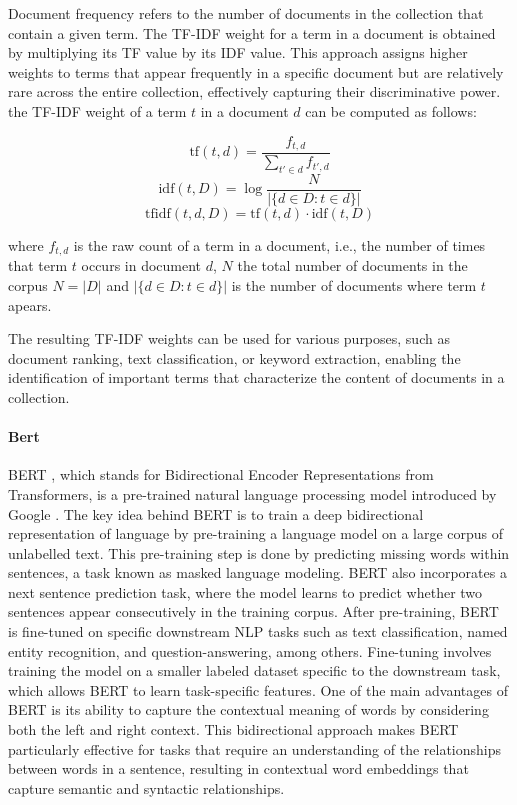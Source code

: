 \documentclass[a4paper,12pt]{article}
\begin{document}
Document frequency refers to the number of documents in the collection that contain a given term. The TF-IDF weight for a term in a document is obtained by multiplying its TF value by its IDF value. This approach assigns higher weights to terms that appear frequently in a specific document but are relatively rare across the entire collection, effectively capturing their discriminative power. the TF-IDF weight of a term $t$ in a document $d$ can be computed as follows:

$${\displaystyle \mathrm {tf} (t,d)={\frac {f_{t,d}}{\sum _{t'\in d}{f_{t',d}}}}}$$
$$ \mathrm{idf}(t, D) =  \log \frac{N}{|\{d \in D: t \in d\}|}$$
$${\displaystyle \mathrm {tfidf} (t,d,D)=\mathrm {tf} (t,d)\cdot \mathrm {idf} (t,D)}$$


where $f_{t,d}$ is the raw count of a term in a document, i.e., the number of times that term $t$ occurs in document $d$,
$N$ the total number of documents in the corpus $N=|D|$ and  $|\{d \in D: t \in d\}|$ is the number of documents where term $t$ apears.

The resulting TF-IDF weights can be used for various purposes, such as document ranking, text classification, or keyword extraction, enabling the identification of important terms that characterize the content of documents in a collection.

\paragraph{Bert}

BERT \cite{bert}, which stands for Bidirectional Encoder Representations from Transformers, is a pre-trained natural language processing model introduced by Google \cite{bert}.
The key idea behind BERT is to train a deep bidirectional representation of language by pre-training a language model on a large corpus of unlabelled text. This pre-training step is done by predicting missing words within sentences, a task known as masked language modeling. 
BERT also incorporates a next sentence prediction task, where the model learns to predict whether two sentences appear consecutively in the training corpus.
After pre-training, BERT is fine-tuned on specific downstream NLP tasks such as text classification, named entity recognition, and question-answering, among others. 
Fine-tuning involves training the model on a smaller labeled dataset specific to the downstream task, which allows BERT to learn task-specific features.
One of the main advantages of BERT is its ability to capture the contextual meaning of words by considering both the left and right context. 
This bidirectional approach makes BERT particularly effective for tasks that require an understanding of the relationships between words in a sentence, resulting in contextual word embeddings that capture semantic and syntactic relationships.
\end{document}
